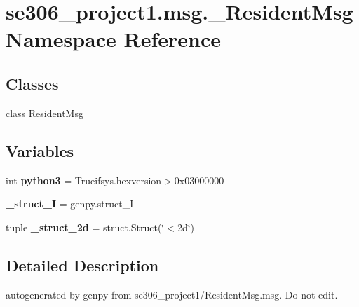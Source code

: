 \hypertarget{namespacese306__project1_1_1msg_1_1__ResidentMsg}{\section{se306\-\_\-project1.\-msg.\-\_\-\-Resident\-Msg Namespace Reference}
\label{namespacese306__project1_1_1msg_1_1__ResidentMsg}
}
\subsection*{Classes}
\begin{DoxyCompactItemize}
\item 
class \hyperlink{classse306__project1_1_1msg_1_1__ResidentMsg_1_1ResidentMsg}{Resident\-Msg}
\end{DoxyCompactItemize}
\subsection*{Variables}
\begin{DoxyCompactItemize}
\item 
\hypertarget{namespacese306__project1_1_1msg_1_1__ResidentMsg_a255c6c3500d1399ba4341772b9b0ef6f}{int {\bfseries python3} = Trueifsys.\-hexversion$>$0x03000000}\label{namespacese306__project1_1_1msg_1_1__ResidentMsg_a255c6c3500d1399ba4341772b9b0ef6f}

\item 
\hypertarget{namespacese306__project1_1_1msg_1_1__ResidentMsg_a4565578fb609fa4999233eae7394f260}{{\bfseries \-\_\-struct\-\_\-\-I} = genpy.\-struct\-\_\-\-I}\label{namespacese306__project1_1_1msg_1_1__ResidentMsg_a4565578fb609fa4999233eae7394f260}

\item 
\hypertarget{namespacese306__project1_1_1msg_1_1__ResidentMsg_a69301674f5084fba144324430fc3d8fb}{tuple {\bfseries \-\_\-struct\-\_\-2d} = struct.\-Struct(\char`\"{}$<$2d\char`\"{})}\label{namespacese306__project1_1_1msg_1_1__ResidentMsg_a69301674f5084fba144324430fc3d8fb}

\end{DoxyCompactItemize}


\subsection{Detailed Description}
\begin{DoxyVerb}autogenerated by genpy from se306_project1/ResidentMsg.msg. Do not edit.\end{DoxyVerb}
 